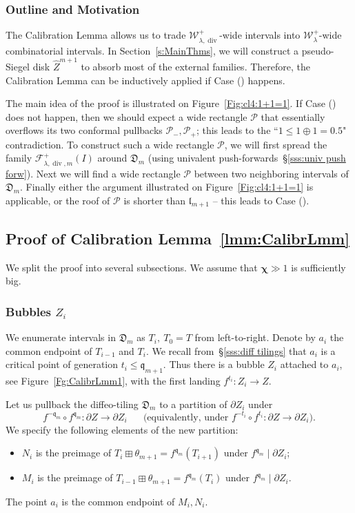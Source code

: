 \documentclass{amsart}
\renewcommand{\sp}{{\ \ }}
\newcommand{\1}{{\mathbb 1 }}
\newcommand{\reminder}[1]{\textsl{$\lhd\rhd$#1$\lhd\rhd$}\marginpar{$\lhd\rhd\lhd\rhd\lhd\rhd$}}
\renewcommand{\div}{{\operatorname{div}}}
\newcommand{\Fam}{{\mathcal F}}
\newcommand{\Width}{{\mathcal W}}
\newcommand{\wZ}{{\widehat Z}}
\newcommand{\qq}{\mathfrak{q}}
\newcommand{\length}{{\mathfrak l}}
\newcommand\PP{\mathcal{P}}
\newcommand{\Dbb}{{\mathfrak{D}}}
\theoremstyle{remark}
\numberwithin{equation}{section}
\theoremstyle{definition}
\newcommand{\bchi}{{\boldsymbol{ \chi}}}
\newcommand{\RN}[1]{\MakeUppercase{\romannumeral#1}}%
\begin{document}
\subsubsection{Outline and Motivation}\label{sss:outline of Calibr} The Calibration Lemma allows us to trade $\Width^+_{\lambda, \div}$-wide intervals into $\Width^+_{\lambda}$-wide combinatorial intervals. In Section~\ref{s:MainThms}, we will construct a pseudo-Siegel disk $\wZ^{m+1}$ to absorb most of the external families. Therefore, the Calibration Lemma can be inductively applied if Case (\RN{2}) happens. 


 The main idea of the proof is illustrated on Figure~\ref{Fig:cl4:1+1=1}. If Case (\RN{1}) does not happen, then we should expect a wide rectangle $\PP$ that essentially overflows its two conformal pullbacks $\PP_-, \PP_+$; this leads to the ``$1\le 1\oplus 1=0.5$" contradiction. To construct such a wide rectangle $\PP$, we will first spread the family $\Fam_{\lambda,\div, m}^+(I)$ around $\Dbb_m$ (using univalent push-forwards~\S\ref{sss:univ push forw}). Next we will find a wide rectangle $\PP$ between two neighboring intervals of $\Dbb_m$. Finally either the argument illustrated on  Figure~\ref{Fig:cl4:1+1=1} is applicable, or the roof of $\PP$ is shorter than $\length_{m+1}$ -- this leads to Case (\RN{2}).





\subsection{Proof of Calibration Lemma~\ref{lmm:CalibrLmm}} 
We split the proof into several subsections. We assume that $\bchi\gg1$ is sufficiently big.

\subsubsection{Bubbles $Z_i$} We enumerate intervals in $\Dbb_m$ as $T_i, \ T_0=T$ from left-to-right. Denote by $a_i$ the common endpoint of $T_{i-1}$ and $T_{i}$. We recall from~\S\ref{sss:diff tilings} that $a_i$ is a critical point of generation $t_i\le \qq_{m+1}$. Thus there is a bubble $Z_i$ attached to $a_i$, see Figure~\ref{Fg:CalibrLmm1}, with the first landing $f^{t_i}\colon Z_i \to Z$. 



Let us pullback the diffeo-tiling $\Dbb_m$ to a partition of $\partial Z_i$ under \[f^{-\qq_m}\circ f^{\qq_m}\colon \partial Z\to \partial Z_i\sp\sp\sp\text{ (equivalently, under $f^{-t_i}\circ f^{t_i}\colon \partial Z\to \partial Z_i$)}.\]  We specify the following elements of the new partition:
\begin{itemize}
\item $N_i$ is the preimage of $T_{i}\boxplus \theta_{m+1}=f^{\qq_m}(T_{i+1})$ under $f^{\qq_m}\mid \partial Z_i$;
\item $M_i$ is the preimage of $T_{i-1} \boxplus \theta_{m+1}=f^{\qq_m}(T_{i})$ under $f^{\qq_m}\mid \partial Z_i$.
\end{itemize}
The point $a_i$ is the common endpoint of $M_i,N_i$.  
\end{document}
